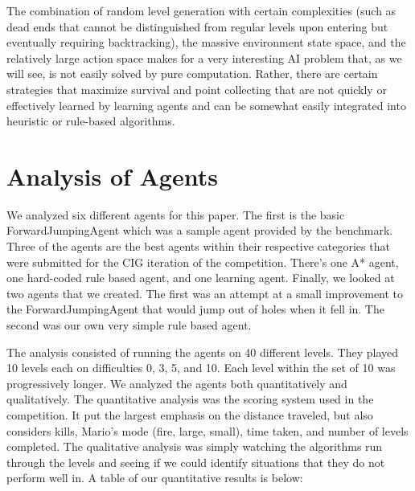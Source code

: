 \documentclass[12pt]{article}
\begin{document}
\begin{multicols}{2}
The combination of random level generation with certain complexities (such as dead ends that cannot be distinguished from regular levels upon 
entering but eventually requiring backtracking), the massive environment state space, and the relatively large action space makes for a very interesting 
AI problem that, as we will see, is not easily solved by pure computation. Rather, there are certain strategies that maximize survival and point collecting that are not
 quickly or effectively learned by learning agents and can be somewhat easily integrated into heuristic or rule-based algorithms.
 
\section * {Analysis of Agents}
We analyzed six different agents for this paper.  The first is the basic ForwardJumpingAgent which 
was a sample agent provided by the benchmark.  Three of the agents are the best agents within
their respective categories that were submitted 
for the CIG iteration of the competition.  There's one A* agent, one hard-coded rule based agent, and 
one learning agent.  Finally, we looked at two agents that we created.  The first was an attempt at a 
small improvement to the ForwardJumpingAgent that would jump out of holes when it fell in.  
The second was our own very simple rule based agent.

The analysis consisted of running the agents on 40 different levels.  They played 10 levels each 
on difficulties 0, 3, 5, and 10.  Each level within the set of 10 was progressively longer.  We analyzed 
the agents both quantitatively and qualitatively.  The quantitative analysis was the scoring system 
used in the competition.  It put the largest emphasis on the distance traveled, but also considers 
kills, Mario's mode (fire, large, small), time taken, and number of levels completed.  The qualitative 
analysis was simply watching the algorithms run through the levels and seeing if we could identify 
situations that they do not perform well in.  A table of our quantitative results is below:
\end{multicols}
\end{document}
